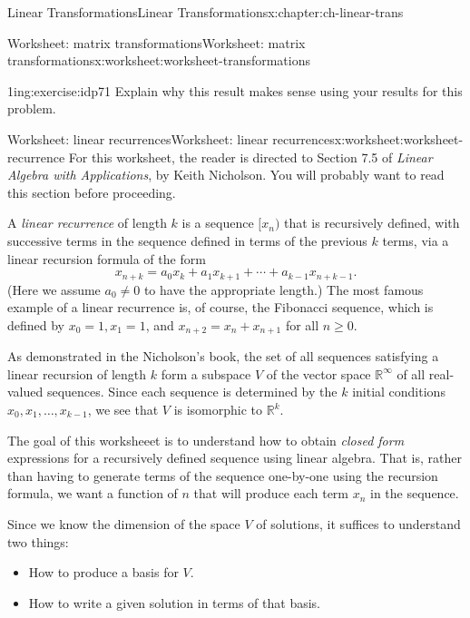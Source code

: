 \documentclass[oneside,10pt,]{book}
\numberwithin{equation}{section}
\begin{document}
\begin{chapterptx}{Linear Transformations}{}{Linear Transformations}{}{}{x:chapter:ch-linear-trans}
\begin{worksheet-section}{Worksheet: matrix transformations}{}{Worksheet: matrix transformations}{}{}{x:worksheet:worksheet-transformations}
\begin{divisionexercise}{7}{}{1in}{g:exercise:idp71}
Explain why this result makes sense using your results for this problem.%
\end{divisionexercise}%
\end{worksheet-section}
\restoregeometry
%
%
\typeout{************************************************}
\typeout{************************************************}
%
\begin{worksheet-section}{Worksheet: linear recurrences}{}{Worksheet: linear recurrences}{}{}{x:worksheet:worksheet-recurrence}
For this worksheet, the reader is directed to Section 7.5 of \emph{Linear Algebra with Applications}, by Keith Nicholson. You will probably want to read this section before proceeding.%
\par
A \emph{linear recurrence} of length \(k\) is a sequence \([x_n)\) that is recursively defined, with successive terms in the sequence defined in terms of the previous \(k\) terms, via a linear recursion formula of the form%
\begin{equation*}
x_{n+k} = a_0x_k + a_1x_{k+1}+\cdots + a_{k-1}x_{n+k-1}\text{.}
\end{equation*}
(Here we assume \(a_0\neq 0\) to have the appropriate length.) The most famous example of a linear recurrence is, of course, the Fibonacci sequence, which is defined by \(x_0=1, x_1=1\), and \(x_{n+2}=x_n+x_{n+1}\) for all \(n\geq 0\).%
\par
As demonstrated in the Nicholson's book, the set of all sequences satisfying a linear recursion of length \(k\) form a subspace \(V\) of the vector space \(\mathbb{R}^\infty\) of all real-valued sequences. Since each sequence is determined by the \(k\) initial conditions \(x_0, x_1, \ldots, x_{k-1}\), we see that \(V\) is isomorphic to \(\mathbb{R}^k\).%
\par
The goal of this worksheeet is to understand how to obtain \emph{closed form} expressions for a recursively defined sequence using linear algebra. That is, rather than having to generate terms of the sequence one-by-one using the recursion formula, we want a function of \(n\) that will produce each term \(x_n\) in the sequence.%
\par
Since we know the dimension of the space \(V\) of solutions, it suffices to understand two things:%
\begin{itemize}[label=\textbullet]
\item{}How to produce a basis for \(V\).%
\item{}How to write a given solution in terms of that basis.%

\end{itemize}
\end{worksheet-section}
\end{chapterptx}
\end{document}

